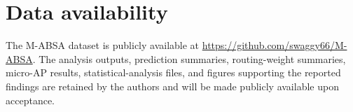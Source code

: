 \documentclass[review,12pt]{elsarticle}
\begin{document}
\section*{Data availability}
The M-ABSA dataset is publicly available at \url{https://github.com/swaggy66/M-ABSA}. The analysis outputs, prediction summaries, routing-weight summaries, micro-AP results, statistical-analysis files, and figures supporting the reported findings are retained by the authors and will be made publicly available upon acceptance.



\end{document}
